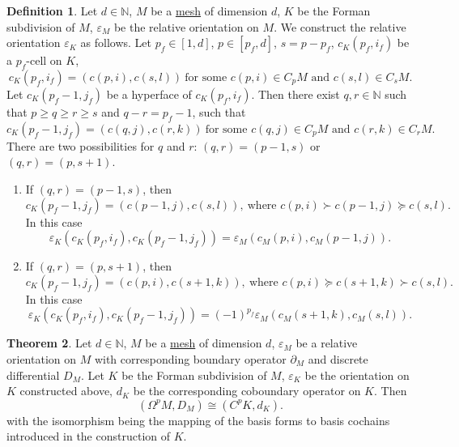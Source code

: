 \documentclass[fleqn]{article}
\theoremstyle{definition}
\newtheorem{theorem}{Theorem}[section]
\newtheorem{definition}[theorem]{Definition}
\newcommand{\N}{\mathbb{N}}
\begin{document}
\begin{definition}
  Let
    $d \in \N$,
    $M$ be a \hyperref[idec:mesh:definition]{mesh} of dimension $d$,
    $K$ be the Forman subdivision of $M$,
    $\varepsilon_M$ be the relative orientation on $M$.
  We construct the relative orientation $\varepsilon_K$ as follows.
  Let 
    $p_f \in [1, d]$,
    $p \in [p_f, d]$,
    $s = p - p_f$,
    $c_K(p_f, i_f)$ be a $p_f$-cell on $K$,
  \begin{equation}
    c_K(p_f, i_f) = (c(p, i), c(s, l))\
    \text{for some $c(p, i) \in C_p M$ and $c(s, l) \in C_s M$}.
  \end{equation}
  Let $c_K(p_f - 1, j_f)$ be a hyperface of $c_K(p_f, i_f)$.
  Then there exist $q, r \in \N$ such that
  $p \geq q \geq r \geq s$ and $q - r = p_f - 1$,
  such that
  \begin{equation}
    c_K(p_f - 1, j_f) = (c(q, j), c(r, k))\
    \text{for some $c(q, j) \in C_p M$ and $c(r, k) \in C_r M$}.
  \end{equation}
  There are two possibilities for $q$ and $r$:
  $(q, r) = (p - 1, s)$ or $(q, r) = (p, s + 1)$.
  \begin{enumerate}
    \item
      If $(q, r) = (p - 1, s)$, then
      \begin{equation}
        c_K(p_f - 1, j_f) = (c(p - 1, j), c(s, l)),\
        \text{where $c(p, i) \succ c(p - 1, j) \succeq c(s, l)$}.
      \end{equation}
      In this case
      \begin{equation}
        \varepsilon_K(c_K(p_f, i_f), c_K(p_f - 1, j_f))
        = \varepsilon_M(c_M(p, i), c_M(p - 1, j)).
      \end{equation}
    \item
      If $(q, r) = (p, s + 1)$, then
      \begin{equation}
        c_K(p_f - 1, j_f) = (c(p, i), c(s + 1, k)),\
        \text{where $c(p, i) \succeq c(s + 1, k) \succ c(s, l)$}.
      \end{equation}
      In this case
      \begin{equation}
        \varepsilon_K(c_K(p_f, i_f), c_K(p_f - 1, j_f))
        = (-1)^{p_f} \varepsilon_M(c_M(s + 1, k), c_M(s, l)).
      \end{equation}
  \end{enumerate}
\end{definition}

\begin{theorem}
  Let
    $d \in \N$,
    $M$ be a \hyperref[idec:mesh:definition]{mesh} of dimension $d$,
    $\varepsilon_M$ be a relative orientation on $M$
      with corresponding boundary operator $\partial_M$
      and discrete differential $D_M$.
  Let $K$ be the Forman subdivision of $M$,
  $\varepsilon_K$ be the orientation on $K$ constructed above,
  $d_K$ be the corresponding coboundary operator on $K$.
  Then
  \begin{equation}
    (\Omega^p M, D_M) \cong (C^p K, d_K).
  \end{equation}
  with the isomorphism being the mapping of the basis forms to basis cochains
  introduced in the construction of $K$.
\end{theorem}
\end{document}
